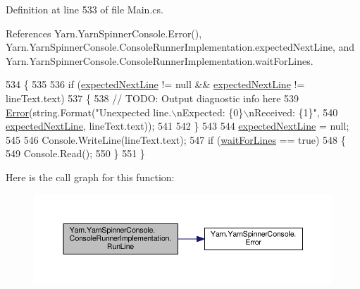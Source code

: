 Definition at line 533 of file Main.\-cs.



References Yarn.\-Yarn\-Spinner\-Console.\-Error(), Yarn.\-Yarn\-Spinner\-Console.\-Console\-Runner\-Implementation.\-expected\-Next\-Line, and Yarn.\-Yarn\-Spinner\-Console.\-Console\-Runner\-Implementation.\-wait\-For\-Lines.


\begin{DoxyCode}
534             \{
535 
536                 \textcolor{keywordflow}{if} (\hyperlink{a00046_a33a44e39f2d90850cee234dfad50f2c5}{expectedNextLine} != null && \hyperlink{a00046_a33a44e39f2d90850cee234dfad50f2c5}{expectedNextLine} != 
      lineText.text)
537                 \{
538                     \textcolor{comment}{// TODO: Output diagnostic info here}
539                     \hyperlink{a00185_a2f63f9f5b7634cb50ee75ff2eb18b137}{Error}(\textcolor{keywordtype}{string}.Format(\textcolor{stringliteral}{"Unexpected line.\(\backslash\)nExpected: \{0\}\(\backslash\)nReceived: \{1\}"},
540                         \hyperlink{a00046_a33a44e39f2d90850cee234dfad50f2c5}{expectedNextLine}, lineText.text));
541 
542                 \}
543 
544                 \hyperlink{a00046_a33a44e39f2d90850cee234dfad50f2c5}{expectedNextLine} = null;
545 
546                 Console.WriteLine(lineText.text);
547                 \textcolor{keywordflow}{if} (\hyperlink{a00046_a90b0c755ea1d2f3ffaffa6cf18266709}{waitForLines} == \textcolor{keyword}{true})
548                 \{
549                     Console.Read();
550                 \}
551             \}
\end{DoxyCode}


Here is the call graph for this function\-:
\nopagebreak
\begin{figure}[H]
\begin{center}
\leavevmode
\includegraphics[width=350pt]{a00046_a13bc6c3a8ba43223a20befae50dbbcb4_cgraph}
\end{center}
\end{figure}


